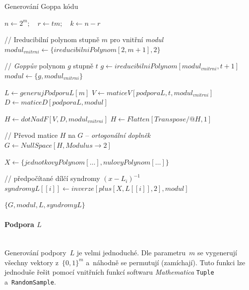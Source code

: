 \documentclass[thesis=M,czech,hidelinks]{FITthesis}[2012/06/26]
\newcommand{\0}{{\textcolor[gray]{0.75}{0}}}
\newenvironment{algoritmus}{
    \floatname{algorithm}{Algoritmus}
    \begin{algorithm}
}{\end{algorithm}}
\begin{document}
\begin{algoritmus}[!ht]
    \caption{Generování Goppa kódu}
    \begin{algorithmic}[1]
        \State $ n \gets 2^m ; \quad r \gets t m ; \quad k \gets n - r $

        // Ireducibilní polynom stupně $m$ pro vnitřní \emph{modul}
        \State $ modul_{vnitrni} \gets \{ ireducibilniPolynom[ 2, m+1 ], 2 \}$

        // \emph{Goppův} polynom $g$ stupně $t$
        \State $ g \gets ireducibilniPolynom[ modul_{vnitrni}, t+1 ] $
        \State $ modul \gets \{ g, modul_{vnitrni} \}$

        \hfil
        \State $ L \gets generujPodporuL[ m ] $
        \State $ V \gets maticeV[ podporaL, t, modul_{vnitrni} ] $
        \State $ D \gets maticeD[ podporaL, modul ] $

        \hfil
        \State $ H \gets dotNadF[ V, D, modul_{vnitrni} ] $
        \State $ H \gets Flatten[Transpose \mathbin{/@} H, 1 ] $

        // Převod matice $H$ na $G$ -- \emph{ortogonální doplněk}
        \State $ G \gets NullSpace[ H, Modulus \to 2 ] $

        \hfil
        \State $ X \gets \{ jednotkovyPolynom[\ldots], nulovyPolynom[\ldots] \} $

        // předpočítané dílčí syndromy $\left(x-L_i\right)^{-1}$
            \State $ syndromyL[[i]] \gets inverze[ plus[X, L[[i]], 2], modul ] $
        \EndFor

        \hfil
        \State \Return $ \{ G, modul, L, syndromyL \}$
     \EndFunction
    \end{algorithmic}
\end{algoritmus}



\paragraph{Podpora $L$} \hfil \\
Generování podpory~$L$ je velmi jednoduché. Dle parametru~$m$ se vygenerují
všechny vektory z~$\{0,1\}^m$ a~náhodně se permutují (zamíchají). Tuto funkci
lze jednoduše řešit pomocí vnitřních funkcí softwaru \emph{Mathematica}
\texttt{Tuple} a~\texttt{Ran\-domSample}. %
\end{document}
